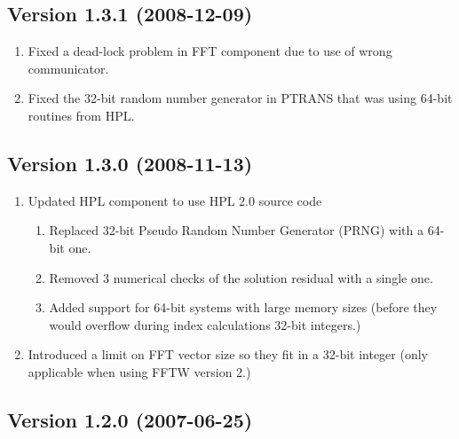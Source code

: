 \documentclass[twocolumn]{article}
\begin{document}
\subsection{Version 1.3.1 (2008-12-09)}
\begin{enumerate}
\item Fixed a dead-lock problem in FFT component due to use of wrong communicator.
\item Fixed the 32-bit random number generator in PTRANS that was using 64-bit
routines from HPL.
\end{enumerate}

\subsection{Version 1.3.0 (2008-11-13)}
\begin{enumerate}
\item Updated HPL component to use HPL 2.0 source code
  \begin{enumerate}
  \item Replaced 32-bit Pseudo Random Number Generator (PRNG) with a 64-bit one.
  \item Removed 3 numerical checks of the solution residual with a single one.
  \item Added support for 64-bit systems with large memory sizes (before they would
  overflow during index calculations 32-bit integers.)
  \end{enumerate}
\item Introduced a limit on FFT vector size so they fit in a 32-bit integer (only
applicable when using FFTW version 2.)
\end{enumerate}

\subsection{Version 1.2.0 (2007-06-25)}
\end{document}
